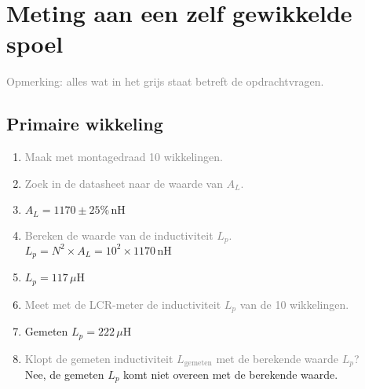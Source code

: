 \section{Meting aan een zelf gewikkelde spoel}
\textcolor{gray}{Opmerking: alles wat in het grijs staat betreft de opdrachtvragen.}
\subsection{Primaire wikkeling}
\begin{enumerate}
    \item \textcolor{gray}{Maak met montagedraad 10 wikkelingen.}
    \item \textcolor{gray}{Zoek in de datasheet naar de waarde van \( A_L \).}
    \item \( A_L = 1170 \pm 25\% \, \text{nH} \)
    \item \textcolor{gray}{Bereken de waarde van de inductiviteit \( L_p \).}
    \\ \( L_p = N^2 \times A_L = 10^2 \times 1170 \, \text{nH} \)
    \item \( L_p = 117 \, \mu \text{H} \)
    \item \textcolor{gray}{Meet met de LCR-meter de inductiviteit \( L_p \) van de 10 wikkelingen.}
    \item Gemeten \( L_p = 222 \, \mu \text{H} \)
    \item \textcolor{gray}{Klopt de gemeten inductiviteit \( L_{\text{gemeten}} \) met de berekende waarde \( L_p \)?}
    \\ Nee, de gemeten \( L_p \) komt niet overeen met de berekende waarde.
\end{enumerate}

